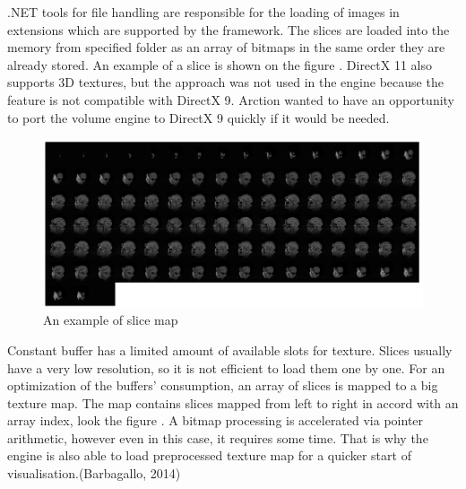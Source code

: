\documentclass[twoside, english, 11pt]{report}
\begin{document}
.NET tools for file handling are responsible for the loading of images in extensions which are supported by the framework. The slices are loaded into the memory from specified folder as an array of bitmaps in the same order they are already stored. An example of a slice is shown on the figure \label{fig:slice}. DirectX 11 also supports 3D textures, but the approach was not used in the engine because the feature is not compatible with DirectX 9. Arction wanted to have an opportunity to port the volume engine to DirectX 9 quickly if it would be needed. \\

\begin{figure}[!h]
\centerline{\includegraphics[scale = 0.35]{img/map}}
\caption{An example of slice map\label{fig:map}}
\end{figure}
Constant buffer has a limited amount of available slots for texture. Slices usually have a very low resolution, so it is not efficient to load them one by one. For an optimization of the buffers' consumption, an array of slices is mapped to a big texture map. The map contains slices mapped from left to right in accord with an array index, look the figure \label{fig:map}. A bitmap processing is accelerated via pointer arithmetic, however even in this case, it requires some time. That is why the engine is also able to load preprocessed texture map for a quicker start of visualisation.(Barbagallo, 2014) \\
\end{document}
